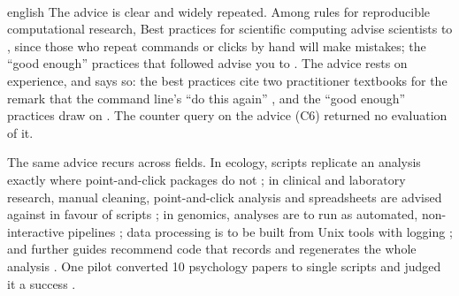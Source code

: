 \paragraph{} %
\begin{onlyin}{english} %
The advice is clear and widely repeated.  Among rules for reproducible
computational research,   Best practices for scientific computing advise
scientists to , since
those who repeat commands or clicks by hand will
 make mistakes; the
\enquote{good enough} practices that followed advise you to
.  The advice rests on experience, and says
so: the best practices cite two practitioner textbooks for the remark
that the command line's \enquote{do this again} , and the \enquote{good
enough} practices draw on .  The counter query on the advice (C6) returned no
evaluation of it.

The same advice recurs across fields.  In ecology, scripts replicate an
analysis exactly where point-and-click packages do not
\autocite{Borregaard2016Towards}; in clinical and laboratory research,
manual cleaning, point-and-click analysis and spreadsheets are advised
against in favour of scripts
\autocite{Kaizer2026Statistical,Obstfeld2026Reproducible,%
Simons2019Reproducible}; in genomics, analyses are to run as automated,
non-interactive pipelines
\autocite{Vos2016Ten,Ziemann2023Recipe,Satagopam2025Best}; data
processing is to be built from Unix tools with logging
\autocite{Spinellis2024Engineering}; and further guides recommend code
that records and regenerates the whole analysis
\autocite{Kelley2008R,Valle2012Computer,RodriguezSanchez2016Ciencia,%
Hutton2016Most,Petyuk2019Reproducibility,Kalenkovich2021Reproducible,%
Finley2026Scripts,Schlogl2026Overcoming}.  One pilot converted 10
psychology papers to single scripts and judged it a success
\autocite{Baker2024Reproduceme}.


\end{onlyin}
